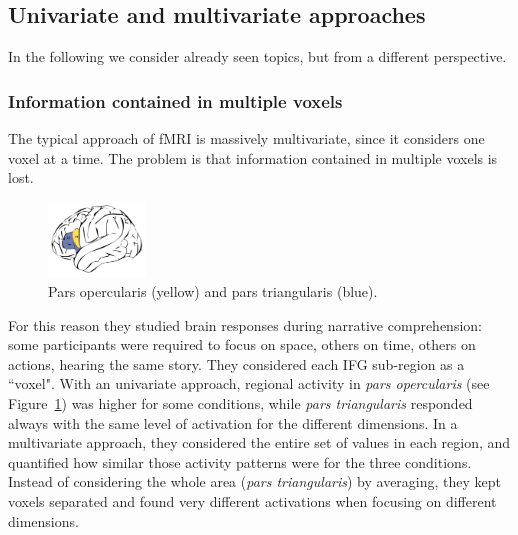 \subsection{Univariate and multivariate approaches}
In the following we consider already seen topics, but from a different perspective.

\subsubsection{Information contained in multiple voxels}
The typical approach of fMRI is massively multivariate, since it considers one voxel at a time. The problem is that information contained in multiple voxels is lost.

\begin{figure}
  \centering
  \includegraphics[width=0.23\textwidth]{images/ptri.png}
  \caption{Pars opercularis (yellow) and pars triangularis (blue).}
  \label{fig:ptri}
\end{figure}

For this reason they studied brain responses during narrative comprehension: some participants were required to focus on space, others on time, others on actions, hearing the same story.
They considered each IFG sub-region as a ``voxel".
With an univariate approach, regional activity in \textit{pars opercularis} (see Figure~\ref{fig:ptri}) was higher for some conditions, while \textit{pars triangularis} responded always with the same level of activation for the different dimensions.
In a multivariate approach, they considered the entire set of values in each region, and quantified how similar those activity patterns were for the three conditions. Instead of considering the whole area (\textit{pars triangularis}) by averaging, they kept voxels separated and found very different activations when focusing on different dimensions.

